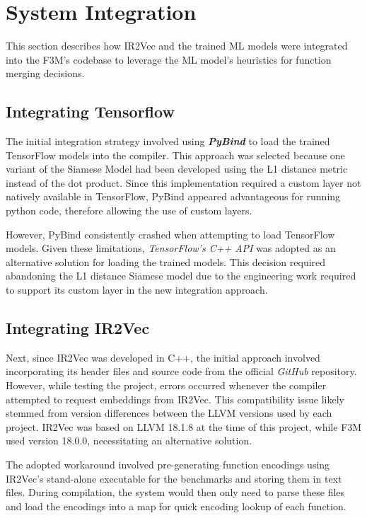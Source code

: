 \section{System Integration}
This section describes how IR2Vec and the trained ML models were integrated into the F3M's codebase to leverage the ML model's heuristics for function merging decisions.

\subsection{Integrating Tensorflow}
The initial integration strategy involved using \textbf{\textit{PyBind}} to load the trained TensorFlow models into the compiler. This approach was selected because one variant of the Siamese Model had been developed using the L1 distance metric instead of the dot product. Since this implementation required a custom layer not natively available in TensorFlow, PyBind appeared advantageous for running python code, therefore allowing the use of custom layers.

However, PyBind consistently crashed when attempting to load TensorFlow models. Given these limitations, \textit{TensorFlow's C++ API} was adopted as an alternative solution for loading the trained models. This decision required abandoning the L1 distance Siamese model due to the engineering work required to support its custom layer in the new integration approach.

\subsection{Integrating IR2Vec} \label{Design:IntegratingLLVM}
Next, since IR2Vec was developed in C++, the initial approach involved incorporating its header files and source code from the official \textit{GitHub} repository. However, while testing the project, errors occurred whenever the compiler attempted to request embeddings from IR2Vec. This compatibility issue likely stemmed from version differences between the LLVM versions used by each project. IR2Vec was based on LLVM 18.1.8 at the time of this project, while F3M used version 18.0.0, necessitating an alternative solution.

The adopted workaround involved pre-generating function encodings using IR2Vec's stand-alone executable for the benchmarks and storing them in text files. During compilation, the system would then only need to parse these files and load the encodings into a map for quick encoding lookup of each function.

